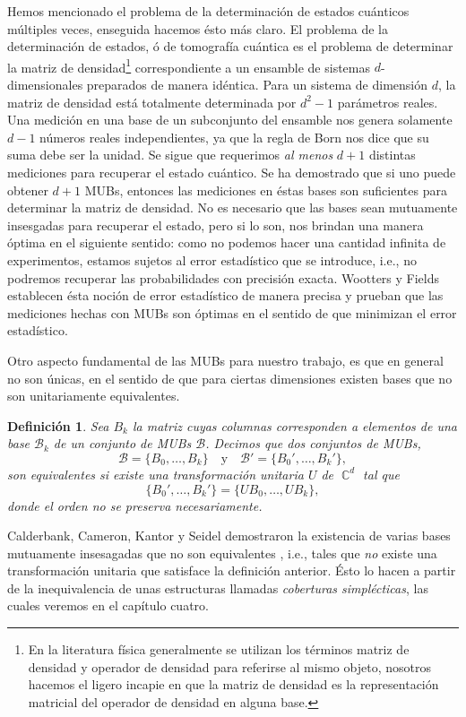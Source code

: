 \documentclass[a4paper,11pt]{report}
\DeclareMathOperator{\C}{\mathbb{C}}
\newtheorem{definition}{Definición}
\begin{document}
  Hemos mencionado el problema de la determinación de
  estados cuánticos múltiples veces, enseguida hacemos ésto
  más claro. El problema de la determinación de estados, ó
  de tomografía cuántica es el problema de determinar la
  matriz de densidad\footnote{En la literatura física
    generalmente se utilizan los términos matriz de densidad
    y operador de densidad para referirse al mismo objeto,
    nosotros hacemos el ligero incapie en que la matriz de
    densidad es la representación matricial del operador de
  densidad en alguna base.} correspondiente a un ensamble
  de sistemas $d$-dimensionales preparados de manera
  idéntica. Para un sistema de dimensión $d$, la matriz de
  densidad está totalmente determinada por $d^2-1$
  parámetros reales. Una medición en una base de un
  subconjunto del ensamble nos genera solamente $d-1$
  números reales independientes, ya que la regla de Born
  nos dice que su suma debe ser la unidad. Se sigue que
  requerimos \textit{al menos} $d+1$ distintas mediciones
  para recuperar el estado cuántico. Se ha demostrado que si
  uno puede obtener $d+1$ MUBs, entonces las mediciones en
  éstas bases son suficientes para determinar la matriz de
  densidad. No es necesario que las bases sean mutuamente
  insesgadas para recuperar el estado, pero si lo son, nos
  brindan una manera óptima en el siguiente sentido: como no
  podemos hacer una cantidad infinita de experimentos,
  estamos sujetos al error estadístico que se introduce,
  i.e., no podremos recuperar las probabilidades con
  precisión exacta. Wootters y Fields  establecen ésta
  noción de error estadístico de manera precisa y prueban
  que las mediciones hechas con MUBs son óptimas en el
  sentido de que minimizan el error estadístico. 

  
  Otro aspecto fundamental de las MUBs para nuestro trabajo,
  es que en general no son únicas, en el sentido de que para
  ciertas dimensiones existen bases que no son unitariamente
  equivalentes.
  \begin{definition}
    Sea $B_k$ la matriz cuyas columnas corresponden a
    elementos de una base $\mathcal B_k$ de un conjunto de
    MUBs $\mathcal B$. Decimos que dos conjuntos de MUBs, 
    \[
      \mathcal B = \{B_0,\ldots,B_k\}
      \quad \text{y} \quad
      \mathcal B' = \{B_0',\ldots, B_k'\},
    \]
    son equivalentes si existe una transformación unitaria
    $U$ de $\C^{d}$ tal que
    \begin{equation}
      \{B_0',\ldots,B_k'\}
      = \{UB_0, \ldots,UB_k\},
    \end{equation}
    donde el orden no se preserva necesariamente.
  \end{definition}
  Calderbank, Cameron, Kantor y Seidel demostraron la
  existencia de varias bases mutuamente insesagadas que no
  son equivalentes \cite{kantor2012}, i.e., tales que
  \textit{no} existe una transformación unitaria que
  satisface la definición anterior. Ésto lo hacen a partir
  de la inequivalencia de unas estructuras llamadas
  \textit{coberturas simplécticas}, las cuales veremos en el
  capítulo cuatro.
\end{document}
